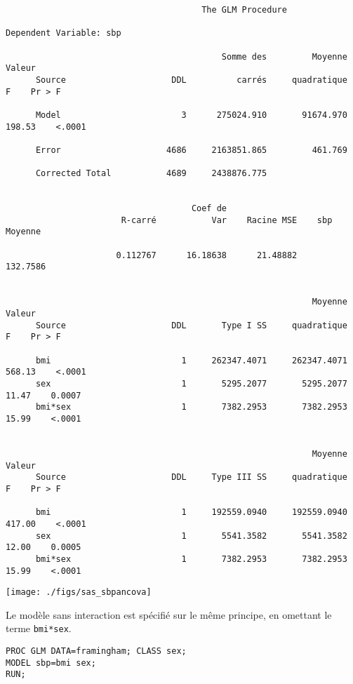 \begin{verbatim}
                                       The GLM Procedure

Dependent Variable: sbp

                                           Somme des         Moyenne     Valeur
      Source                     DDL          carrés     quadratique          F    Pr > F

      Model                        3      275024.910       91674.970     198.53    <.0001

      Error                     4686     2163851.865         461.769

      Corrected Total           4689     2438876.775


                                     Coef de
                       R-carré           Var    Racine MSE    sbp Moyenne

                      0.112767      16.18638      21.48882       132.7586


                                                             Moyenne     Valeur
      Source                     DDL       Type I SS     quadratique          F    Pr > F

      bmi                          1     262347.4071     262347.4071     568.13    <.0001
      sex                          1       5295.2077       5295.2077      11.47    0.0007
      bmi*sex                      1       7382.2953       7382.2953      15.99    <.0001


                                                             Moyenne     Valeur
      Source                     DDL     Type III SS     quadratique          F    Pr > F

      bmi                          1     192559.0940     192559.0940     417.00    <.0001
      sex                          1       5541.3582       5541.3582      12.00    0.0005
      bmi*sex                      1       7382.2953       7382.2953      15.99    <.0001
\end{verbatim}

\texttt{[image: ./figs/sas\_sbpancova]}

Le modèle sans interaction est spécifié sur le même principe, en omettant le
terme \texttt{bmi*sex}.
\begin{verbatim}
PROC GLM DATA=framingham; CLASS sex;
MODEL sbp=bmi sex;
RUN;
\end{verbatim}

